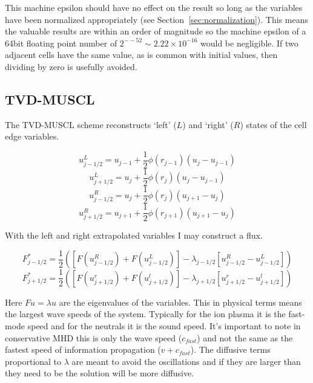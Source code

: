 \documentclass[12pt,upcase]{umlthesis}
\begin{document}
This machine epsilon should have no effect on the result so long as the variables have been normalized appropriately (see Section~\ref{sec:normalization}). This means the valuable results are within an order of magnitude so the machine epsilon of a 64bit floating point number of $2^{-−52} \sim 2.22 \times 10^{-16}$ would be negligible. If two adjacent cells have the same value, as is common with initial values, then dividing by zero is usefully avoided.

\subsection{TVD-MUSCL}\label{sec:tvd-muscl}

The TVD-MUSCL scheme reconstructs `left' ($L$) and `right' ($R$) states of the cell edge variables. 

\begin{equation}
	u^L_{j-1/2} = u_{j-1} + \frac{1}{2} \phi(r_{j-1}) (u_j - u_{j-1})
\end{equation}
\begin{equation}
	u^L_{j+1/2} = u_{j} + \frac{1}{2} \phi(r_{j}) (u_j - u_{j-1})
\end{equation}
\begin{equation}
	u^R_{j-1/2} = u_{j} + \frac{1}{2} \phi(r_{j}) (u_{j+1} - u_{j})
\end{equation}
\begin{equation}
	u^R_{j+1/2} = u_{j+1} + \frac{1}{2} \phi(r_{j+1}) (u_{j+1} - u_{j})
\end{equation}

With the left and right extrapolated variables I may construct a flux.

\begin{equation}
	F^*_{j-1/2} = \frac{1}{2} ([F(u^R_{j-1/2})+F(u^L_{j-1/2})] - \lambda_{j-1/2}[u^R_{j-1/2}-u^L_{j-1/2}])
\end{equation}
\begin{equation}
	F^*_{j+1/2} = \frac{1}{2} ([F(u^r_{j+1/2})+F(u^l_{j+1/2})] - \lambda_{j+1/2}[u^r_{j+1/2}-u^l_{j+1/2}])
\end{equation}

Here $F u = \lambda u$ are the eigenvalues of the variables. This in physical terms means the largest wave speeds of the system. Typically for the ion plasma it is the fast-mode speed and for the neutrals it is the sound speed. It's important to note in conservative MHD this is only the wave speed ($c_{fast}$) and not the same as the fastest speed of information propagation ($v+c_{fast}$). The diffusive terms proportional to $\lambda$ are meant to avoid the oscillations and if they are larger than they need to be the solution will be more diffusive.
\end{document}
